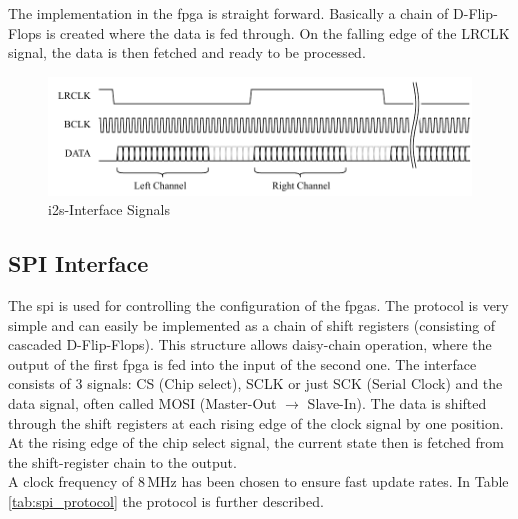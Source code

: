 The implementation in the \acrshort{fpga} is straight forward. Basically a chain of D-Flip-Flops is created where the data is fed through. On the falling edge of the LRCLK signal, the data is then fetched and ready to be processed.

\begin{figure}[h!]
    \centering
    \includegraphics[width=\textwidth]{images/4_Design/FPGA/I2S-Interface.pdf}
    \caption{\acrshort{i2s}-Interface Signals}
    \label{4_fig:fpga_i2s_signals}
\end{figure}

\newpage
\subsection{SPI Interface} \label{fpga_spi}
The \acrfull{spi} is used for controlling the configuration of the \acrshort{fpga}s. The protocol is very simple and can easily be implemented as a chain of shift registers (consisting of cascaded D-Flip-Flops). This structure allows daisy-chain operation, where the output of the first \acrshort{fpga} is fed into the input of the second one. The interface consists of 3 signals: CS (Chip select), SCLK or just SCK (Serial Clock) and the data signal, often called MOSI (Master-Out $\rightarrow$ Slave-In). The data is shifted through the shift registers at each rising edge of the clock signal by one position. At the rising edge of the chip select signal, the current state then is fetched from the shift-register chain to the output. \\
A clock frequency of 8\,MHz has been chosen to ensure fast update rates. In Table \ref{tab:spi_protocol} the protocol is further described.

